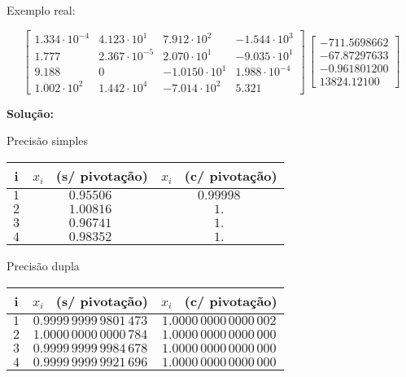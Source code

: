 \begin{example}

Exemplo real:

\[
\left[
 \begin{array}{llll}
  1.334 \cdot 10^{-4} & 4.123 \cdot 10^1 & 7.912 \cdot 10^2 & -1.544 \cdot 10^3 \\
  1.777 & 2.367 \cdot 10^{-5} & 2.070 \cdot 10^1 & -9.035 \cdot 10^1 \\
  9.188 & 0 & -1.0150 \cdot 10^1 & 1.988 \cdot 10^{-4} \\
  1.002 \cdot 10^2 & 1.442 \cdot 10^4 & -7.014 \cdot 10^2 & 5.321
 \end{array}
\right]
\,
\left[
 \begin{array}{llll}
  -711.5698662 \\
  -67.87297633 \\
  -0.961801200 \\
  13824.12100
 \end{array}
\right]
\]

\textbf{Solução:}

\begin{enumerar}

\item Precisão simples

{
\footnotesize
\centering
	
\begin{tabular}{|c|c|c|}
	\hline
	\textbf{i} & \textbf{$x_i$ \, (s/ pivotação)} & \textbf{$x_i$ \, (c/ pivotação)} \\
	\hline \hline
	$1$ & $0.95506$ & $0.99998$ \\
	\hline
	$2$ & $1.00816$ & $1.$ \\
	\hline
	$3$ & $0.96741$ & $1.$ \\
	\hline
	$4$ & $0.98352$ & $1.$ \\
	\hline
\end{tabular}
}

\item Precisão dupla

{
\footnotesize
\centering
	
\begin{tabular}{|c|c|c|}
	\hline
	\textbf{i} & \textbf{$x_i$ \, (s/ pivotação)} & \textbf{$x_i$ \, (c/ pivotação)} \\
	\hline \hline
	$1$ & $0.9999\,9999\,9801\,473$ & $1.0000\,0000\,0000\,002$ \\
	\hline
	$2$ & $1.0000\,0000\,0000\,784$ & $1.0000\,0000\,0000\,000$ \\
	\hline
	$3$ & $0.9999\,9999\,9984\,678$ & $1.0000\,0000\,0000\,000$ \\
	\hline
	$4$ & $0.9999\,9999\,9921\,696$ & $1.0000\,0000\,0000\,000$ \\
	\hline
\end{tabular}
}

\end{enumerar}

\end{example}


